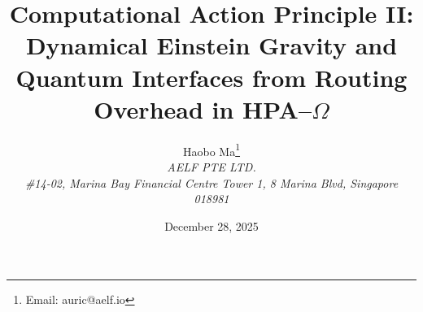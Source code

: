 \documentclass[11pt,a4paper]{article}
\title{Computational Action Principle II: Dynamical Einstein Gravity and Quantum Interfaces from Routing Overhead in HPA--$\Omega$}
\author{Haobo Ma\thanks{Email: auric@aelf.io} \\
\textit{AELF PTE LTD.} \\
\textit{\#14-02, Marina Bay Financial Centre Tower 1, 8 Marina Blvd, Singapore 018981}}
\date{December 28, 2025}
\begin{document}
\maketitle

















\FloatBarrier
\appendix


\FloatBarrier

\end{document}
